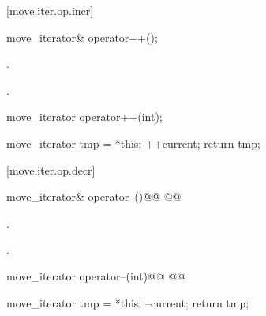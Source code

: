 [move.iter.op.incr]{}

%
%
\begin{itemdecl}
move_iterator& operator++();
\end{itemdecl}

\begin{itemdescr}
\pnum
\effects {}.

\pnum
\returns {}.
\end{itemdescr}

%
%
\begin{itemdecl}
move_iterator operator++(int);
\end{itemdecl}

\begin{itemdescr}
\pnum
\effects
\begin{codeblock}
move_iterator tmp = *this;
++current;
return tmp;
\end{codeblock}
\end{itemdescr}

[move.iter.op.decr]{}

%
%
\begin{itemdecl}
move_iterator& operator--()@\removed{;}@
  @@
\end{itemdecl}

\begin{itemdescr}
\pnum
\effects {}.

\pnum
\returns {}.
\end{itemdescr}

%
%
\begin{itemdecl}
move_iterator operator--(int)@\removed{;}@
  @@
\end{itemdecl}

\begin{itemdescr}
\pnum
\effects
\begin{codeblock}
move_iterator tmp = *this;
--current;
return tmp;
\end{codeblock}
\end{itemdescr}

